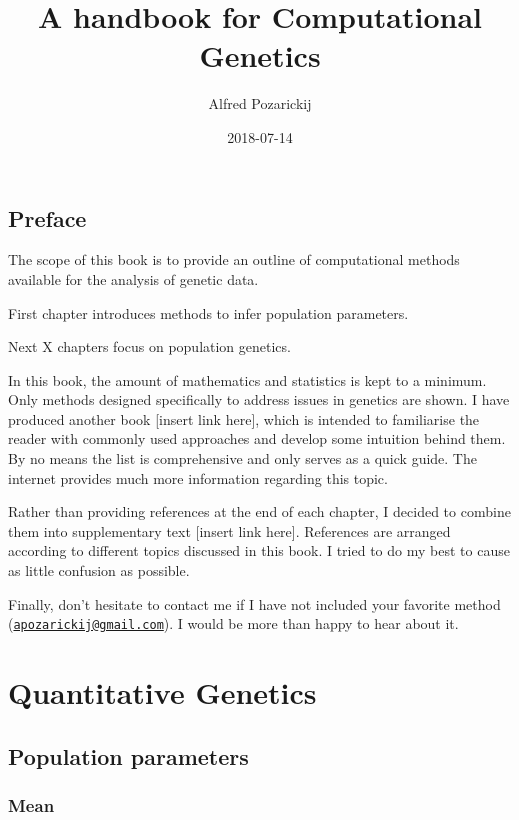 \documentclass[]{book}
\title{A handbook for Computational Genetics}
\author{Alfred Pozarickij}
\date{2018-07-14}
\theoremstyle{definition}
\theoremstyle{definition}
\theoremstyle{definition}
\theoremstyle{remark}
\begin{document}
\maketitle

{
\setcounter{tocdepth}{1}
\tableofcontents
}
\chapter*{Preface}\label{preface}

The scope of this book is to provide an outline of computational methods
available for the analysis of genetic data.

First chapter introduces methods to infer population parameters.

Next X chapters focus on population genetics.

In this book, the amount of mathematics and statistics is kept to a
minimum. Only methods designed specifically to address issues in
genetics are shown. I have produced another book {[}insert link here{]},
which is intended to familiarise the reader with commonly used
approaches and develop some intuition behind them. By no means the list
is comprehensive and only serves as a quick guide. The internet provides
much more information regarding this topic.

Rather than providing references at the end of each chapter, I decided
to combine them into supplementary text {[}insert link here{]}.
References are arranged according to different topics discussed in this
book. I tried to do my best to cause as little confusion as possible.

Finally, don't hesitate to contact me if I have not included your
favorite method
(\href{mailto:apozarickij@gmail.com}{\nolinkurl{apozarickij@gmail.com}}).
I would be more than happy to hear about it.

\part{Quantitative
Genetics}\label{part-quantitative-genetics}

\chapter{Population parameters}\label{population-parameters}

\section{Mean}\label{mean}
\end{document}
